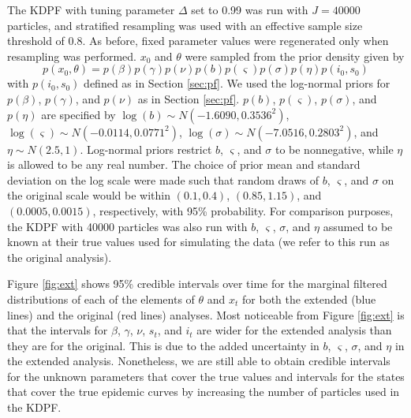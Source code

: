 \documentclass{elsarticle}
\begin{document}
The KDPF with tuning parameter $\Delta$ set to 0.99 was run with $J = 40000$ particles, and stratified resampling was used with an effective sample size threshold of 0.8. As before, fixed parameter values were regenerated only when resampling was performed. $x_0$ and $\theta$ were sampled from the prior density given by
\[ p\left(x_0,\theta\right) = p\left(\beta\right)p\left(\gamma\right)p\left(\nu\right)p\left(b\right)p\left(\varsigma\right)p\left(\sigma\right)p\left(\eta\right)p\left(i_0,s_0\right) \]
\noindent with $p(i_0,s_0)$ defined as in Section \ref{sec:pf}. We used the log-normal priors for $p(\beta)$, $p(\gamma)$, and $p(\nu)$ as in Section \ref{sec:pf}. $p(b)$, $p(\varsigma)$, $p(\sigma)$, and $p(\eta)$ are specified by $\log\left(b\right) \sim  N\left(-1.6090, 0.3536^2\right)$, $\log\left(\varsigma\right) \sim N\left(-0.0114, 0.0771^2\right)$, $\log\left(\sigma\right) \sim N\left(-7.0516, 0.2803^2\right)$, and $\eta \sim N\left(2.5, 1\right)$. Log-normal priors restrict $b$, $\varsigma$, and $\sigma$ to be nonnegative, while $\eta$ is allowed to be any real number. The choice of prior mean and standard deviation on the log scale were made such that random draws of $b$, $\varsigma$, and $\sigma$ on the original scale would be within $(0.1, 0.4)$, $(0.85, 1.15)$, and $(0.0005, 0.0015)$, respectively, with 95\% probability. For comparison purposes, the KDPF with 40000 particles was also run with $b$, $\varsigma$, $\sigma$, and $\eta$ assumed to be known at their true values used for simulating the data (we refer to this run as the original analysis).

Figure \ref{fig:ext} shows 95\% credible intervals over time for the marginal filtered distributions of each of the elements of $\theta$ and $x_t$ for both the extended (blue lines) and the original (red lines) analyses. Most noticeable from Figure \ref{fig:ext} is that the intervals for $\beta$, $\gamma$, $\nu$, $s_t$, and $i_t$ are wider for the extended analysis than they are for the original. This is due to the added uncertainty in $b$, $\varsigma$, $\sigma$, and $\eta$ in the extended analysis. Nonetheless, we are still able to obtain credible intervals for the unknown parameters that cover the true values and intervals for the states that cover the true epidemic curves by increasing the number of particles used in the KDPF.

\end{document}
